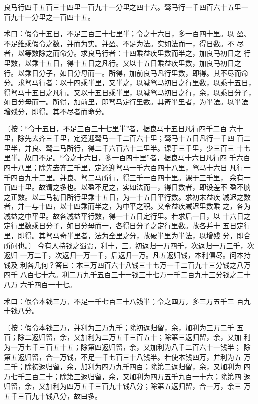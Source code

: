 \documentclass[a4paper,12pt,UTF8,twoside]{ctexbook}
\begin{document}
良马行四千五百三十四里一百九十一分里之四十六。驽马行一千四百六十五里一 百九十一分里之一百四十五。

术曰：假令十五日，不足三百三十七里半；令之十六日，多一百四十里。以 盈、不足维乘假令之数，并而为实。并盈、不足为法。实如法而一，得日数。不 尽者，以等数除之而命分。求良马行者：十四乘益疾里数而半之，加良马初日之 行里数，以乘十五日，得十五日之凡行。又以十五日乘益疾里数，加良马初日之 行。以乘日分子，如日分母而一。所得，加前良马凡行里数，即得。其不尽而命 分。求驽马行者：以十四乘半里，又半之，以减驽马初日之行里数，以乘十五日， 得驽马十五日之凡行。又以十五日乘半里，以减驽马初日之行，余，以乘日分子， 如日分母而一。所得，加前里，即驽马定行里数。其奇半里者，为半法。以半法 增残分，即得。其不尽者而命分。

〔按：“令十五日，不足三百三十七里半”者，据良马十五日凡行四千二百 六十里，除先去齐三千里，定还迎驽马一千二百六十里；驽马十五日凡行一千四 百二里半，并良、驽二马所行，得二千六百六十二里半。课于三千里，少三百三 十七里半。故曰不足。“令之十六日，多一百四十里”者，据良马十六日凡行四 千六百四十八里；除先去齐三千里，定还迎驽马一千六百四十八里，驽马十六日 凡行一千四百九十二里。并良、驽二马所行，得三千一百四十里。课于三千里， 余有一百四十里。故谓之多也。以盈不足之，实如法而一，得日数者，即设差不 盈不朒之正数。以二马初日所行里乘十五日，为一十五日平行数。求初末益疾 减迟之数者，并一与十四，以十四乘而半之，为中平之积。又令益疾减迟里数乘 之，各为减益之中平里。故各减益平行数，得一十五日定行里。若求后一日，以 十六日之定行里数乘日分子，如日分母而一，各得日分子之定行里数。故各并十 五日定行里，即得。其驽马奇半里者，法为全里之分，故破半里为半法，以增残 分，即合所问也。〕 今有人持钱之蜀贾，利十，三。初返归一万四千，次返归一万三千，次返归 一万二千，次返归一万一千，后返归一万。凡五返归钱，本利俱尽。问本持钱及 利各几何？答曰：本三万四百六十八钱三十七万一千二百九十三分钱之八万四千 八百七十六。利二万九千五百三十一钱三十七万一千二百九十三分钱之二十八万 六千四百一十七。

术曰：假令本钱三万，不足一千七百三十八钱半；令之四万，多三万五千三 百九十钱八分。

〔按：假令本钱三万，并利为三万九千；除初返归留，余，加利为三万二千 五百；除二返归留，余，又加利为二万五千三百五十；除第三返归留，余，又加 利为一万七千三百五十五；除第四返归留，余，又加利为八千二百六十一钱半； 除第五返归留，合一万钱，不足一千七百三十八钱半。若使本钱四万，并利为五 万二千；除初返归留，余，加利为四万九千四百；除第二返归留，余，又加利为 四万七千三百二十；除第三返归留，余，又加利为四万五千九百一十六；除第四 返归留，余，又加利为四万五千三百九十钱八分；除第五返归留，合一万，余三 万五千三百九十钱八分，故曰多。
\end{document}
